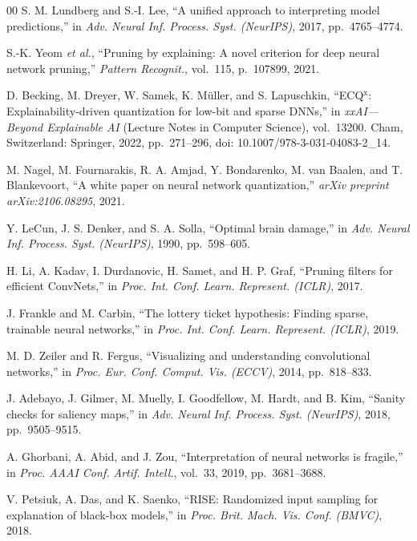 \begin{thebibliography}{00}
S. M. Lundberg and S.-I. Lee, ``A unified approach to interpreting model
predictions,'' in \textit{Adv. Neural Inf. Process. Syst. (NeurIPS)}, 2017,
pp.\ 4765--4774.

S.-K. Yeom \textit{et al.}, ``Pruning by explaining: A novel criterion for deep
neural network pruning,'' \textit{Pattern Recognit.}, vol.\ 115, p.\ 107899,
2021.

D. Becking, M. Dreyer, W. Samek, K. M\"uller, and S. Lapuschkin,
``ECQ$^{\text{x}}$: Explainability-driven quantization for low-bit and sparse
DNNs,'' in \textit{xxAI---Beyond Explainable AI} (Lecture Notes in Computer
Science), vol.\ 13200. Cham, Switzerland: Springer, 2022, pp.\ 271--296, doi:
10.1007/978-3-031-04083-2\_14.

M. Nagel, M. Fournarakis, R. A. Amjad, Y. Bondarenko, M. van Baalen, and T.
Blankevoort, ``A white paper on neural network quantization,'' \textit{arXiv
preprint arXiv:2106.08295}, 2021.

Y. LeCun, J. S. Denker, and S. A. Solla, ``Optimal brain damage,'' in
\textit{Adv. Neural Inf. Process. Syst. (NeurIPS)}, 1990, pp.\ 598--605.

H. Li, A. Kadav, I. Durdanovic, H. Samet, and H. P. Graf, ``Pruning filters for
efficient ConvNets,'' in \textit{Proc. Int. Conf. Learn. Represent. (ICLR)},
2017.

J. Frankle and M. Carbin, ``The lottery ticket hypothesis: Finding sparse,
trainable neural networks,'' in \textit{Proc. Int. Conf. Learn. Represent.
(ICLR)}, 2019.

M. D. Zeiler and R. Fergus, ``Visualizing and understanding convolutional
networks,'' in \textit{Proc. Eur. Conf. Comput. Vis. (ECCV)}, 2014, pp.\
818--833.

J. Adebayo, J. Gilmer, M. Muelly, I. Goodfellow, M. Hardt, and B. Kim, ``Sanity
checks for saliency maps,'' in \textit{Adv. Neural Inf. Process. Syst.
(NeurIPS)}, 2018, pp.\ 9505--9515.

A. Ghorbani, A. Abid, and J. Zou, ``Interpretation of neural networks is
fragile,'' in \textit{Proc. AAAI Conf. Artif. Intell.}, vol.\ 33, 2019, pp.\
3681--3688.

V. Petsiuk, A. Das, and K. Saenko, ``RISE: Randomized input sampling for
explanation of black-box models,'' in \textit{Proc. Brit. Mach. Vis. Conf.
(BMVC)}, 2018.


\end{thebibliography}
